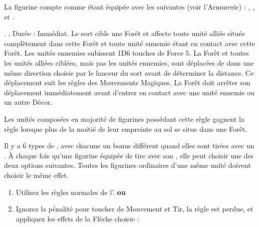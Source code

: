 \armyspecialruleentry{\masterarcher}

La figurine compte comme étant équipée avec les \feyarrows{} suivantes (voir l'Armurerie) :\newline
\truemarkarrow{}, \starlightshaft{}, \perforatingtip{} et \jewelweedshot{}.

\armyspecialruleentry{\treesinging}

. , Durée : Immédiat.\newline
Le sort cible une Forêt et affecte toute unité alliée située complètement dans cette Forêt et toute unité ennemie étant en contact avec cette Forêt. Les unités ennemies subissent 1D6 touches de Force 5. La Forêt et toutes les unités alliées ciblées, mais pas les unités ennemies, sont déplacées de  dans une même direction choisie par le lanceur du sort avant de déterminer la distance. Ce déplacement suit les règles des Mouvements Magiques. La Forêt doit arrêter son déplacement immédiatement avant d'entrer en contact avec une unité ennemie ou un autre Décor.

\armyspecialruleentry{\emboldeningboughs}

Les unités composées en majorité de figurines possédant cette règle gagnent la règle \stubborn{} lorsque plus de la moitié de leur empreinte au sol se situe dans une Forêt.

\closearmyspecialrules






\newpage
\startarmyarmoury

\startitemlistonecol

\listitemonecol{\feyarrows} Il y a 6 types de \feyarrows{}, avec chacune un bonus différent quand elles sont tirées avec un \longbow{}. À chaque fois qu'une figurine équipée de \feyarrows{} tire avec son \longbow{}, elle peut choisir une des deux options suivantes. Toutes les figurines ordinaires d'une même unité doivent choisir le même effet. 
\begin{enumerate}
\item Utilisez les règles normales de l'\longbow{}.\newline
\hspace*{0.5cm}\textbf{ou}
\item Ignorez la pénalité pour toucher de Mouvement et Tir, la règle \volleyfire{} est perdue, et appliquez les effets de la Flèche choisie :
\end{enumerate}

